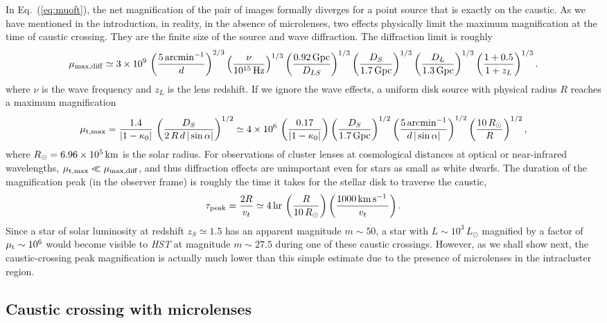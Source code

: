 \documentclass{aastex6}
\newcommand{\refeq}[1]{Eq.~(\ref{eq:#1})}
\def\kms{\, {\rm km}\, {\rm s}^{-1}\, }
\newcommand{\ba}{\begin{eqnarray}}
\newcommand{\ea}{\end{eqnarray}}
\begin{document}
In \refeq{muoft}, the net magnification of the pair of images formally diverges for a point source that is exactly on the caustic. As we have mentioned in the introduction, in reality, in the absence of microlenses, two effects physically limit the maximum magnification at the time of caustic crossing. They are the finite size of the source and wave diffraction. The diffraction limit is roughly \citep[see, e.g.,][]{2017PhRvD..95d4011D}
\ba
\mu_{\rm max,diff} \simeq 3\times 10^9 \,
 \left( \frac{5\,{\rm arcmin}^{-1}}{d} \right)^{2/3}
 \left( \frac{\nu}{10^{15}\,{\rm Hz}} \right)^{1/3}
 \left( \frac{0.92\,{\rm Gpc}}{D_{LS}} \right)^{1/3}
 \left( \frac{D_S}{1.7\,{\rm Gpc}} \right)^{1/3}
 \left( \frac{D_L}{1.3\,{\rm Gpc}} \right)^{1/3}
 \left( \frac{1+0.5}{1+z_L} \right)^{1/3}.
 \label{eq:mumaxdiff}
\ea
where $\nu$ is the wave frequency and $z_L$ is the lens redshift. If we ignore the wave effects, a uniform disk source with physical radius $R$ reaches a maximum magnification \citep{1991ApJ...379...94M}
\ba
\label{eq:mumax-smooth}
\mu_{\rm t,max} = \frac{1.4}{|1-\kappa_0|}\,
\left( \frac{D_S}{2\, R\,d\,|\sin\alpha|} \right)^{1/2} \simeq
4 \times 10^6\, \left( \frac{0.17}{|1-\kappa_0|} \right)
\left( \frac{D_S}{1.7\,{\rm Gpc}} \right)^{1/2}
\left( \frac{5\,{\rm arcmin}^{-1}}{d\,|\sin\alpha|} \right)^{1/2}
\left( \frac{10\,R_\odot}{R} \right)^{1/2},
\ea
where $R_\odot = 6.96 \times 10^5\,{\rm km}$ is the solar radius. For observations of cluster lenses at cosmological distances at optical or near-infrared wavelengths, $\mu_{\rm t,max} \ll \mu_{\rm max,diff}$, and thus diffraction effects are unimportant even for stars as small as white dwarfs. The duration of the magnification peak (in the observer frame) is roughly the time it takes for the stellar disk to traverse the caustic,
\ba
\label{eq:timescale-peak}
\tau_{\rm peak} = \frac{2R}{v_t} \simeq 4\,{\rm hr}\,
\left(\frac{R}{10\, R_\odot}\right) \left( \frac{1000\kms}{v_t} \right) .
\ea
Since a star of solar luminosity at redshift $z_S \simeq 1.5$ has an apparent magnitude $m \sim 50$, a star with $L\sim 10^3\, L_{\odot}$ magnified by a factor of $\mu_{\rm t} \sim 10^6$ would become visible to {\em HST} at magnitude $m \sim 27.5$ during one of these caustic crossings. However, as we shall show next, the caustic-crossing peak magnification is actually much lower than this simple estimate due to the presence of microlenses in the intracluster region.

\subsection{Caustic crossing with microlenses}
\label{sec:microlens}
\end{document}
